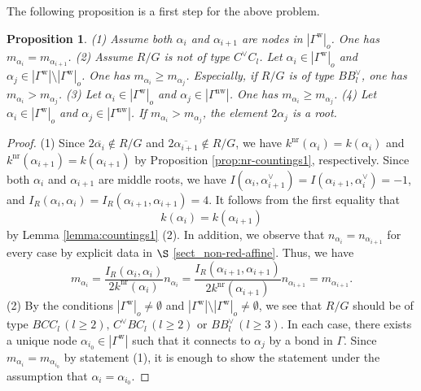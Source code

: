 \documentclass[11pt]{amsart}
\newcommand{\nr}{\mathrm{nr}}
\newcommand{\w}{\mathrm{w}}
\newcommand{\nw}{\mathrm{nw}}
\newtheorem{prop}[thm]{Proposition}%
\begin{document}
{The following proposition is a first step for the above problem.

\begin{prop}\label{prop:shape-diagram1}
{\rm (1)} Assume both $\alpha_i$ and $\alpha_{i+1}$ are nodes in 
$|\Gamma^\w|_o$. One has $m_{\alpha_i}=m_{\alpha_{i+1}}$.
\vskip 1mm
\noindent
{\rm (2)} Assume $R/G$ is not of type $C^\vee C_l$. 
Let $\alpha_i\in |\Gamma^\w|_o$ and 
$\alpha_j\in |\Gamma^\w|\setminus |\Gamma^\w|_o$. 
One has $m_{\alpha_i}\geq m_{\alpha_j}$. Especially, if $R/G$ is of type 
$BB^\vee_l$, one has $m_{\alpha_i}>m_{\alpha_j}$. 
\vskip 1mm
\noindent
{\rm (3)} 
Let $\alpha_i\in |\Gamma^\w|_o$ and 
$\alpha_j\in |\Gamma^\nw|$. 
One has $m_{\alpha_i}\geq m_{\alpha_j}$.
\vskip 1mm
\noindent
{\rm (4)} Let $\alpha_i\in |\Gamma^\w|_o$ and 
$\alpha_j\in |\Gamma^\nw|$. If 
$m_{\alpha_i}> m_{\alpha_j}$, the element $2\alpha_j$ is a root. 
\end{prop}

\begin{proof}
(1) Since $2\overline{\alpha_i}\not\in R/G$ and 
$2\overline{\alpha_{i+1}}\not\in R/G$,
we have $k^\nr(\alpha_i)=k(\alpha_i)$ and $k^\nr(\alpha_{i+1})=k(\alpha_{i+1})$
by Proposition \ref{prop:nr-countings1}, respectively. Since both $\alpha_i$ and
$\alpha_{i+1}$ are middle roots, we have 
$I(\alpha_i,\alpha_{i+1}^\vee)=I(\alpha_{i+1},\alpha_{i}^\vee)=-1$, and
$I_R(\alpha_i,\alpha_{i})=I_R(\alpha_{i+1},\alpha_{i+1})=4$. It follows from the
first equality that 
\begin{equation}
k(\alpha_i)=k(\alpha_{i+1})
\end{equation}
by Lemma \ref{lemma:countings1} (2). 
In addition, we observe that $n_{\alpha_i}=n_{\alpha_{i+1}}$ for every case 
by explicit data in $\S$ \ref{sect_non-red-affine}. Thus, we  have
\[m_{\alpha_i}=\frac{I_R(\alpha_i,\alpha_i)}{2 k^\nr (\alpha_i)}n_{\alpha_i}
=\frac{I_R(\alpha_{i+1},\alpha_{i+1})}{2 k^\nr (\alpha_{i+1})}n_{\alpha_{i+1}}
=m_{\alpha_{i+1}}.\]
\noindent
(2) By the conditions $|\Gamma^\w|_o\ne\emptyset$ and 
$|\Gamma^\w|\setminus |\Gamma^\w|_o\ne \emptyset$, 
we see that $R/G$ should be of type $BCC_l \,(l\geq 2),\,  
C^\vee BC_l\,(l\geq 2)$ or $BB^\vee_l\,(l\geq 3)$. In each case, 
there exists a unique node $\alpha_{i_0}\in |\Gamma^\w|$ such that it connects 
to $\alpha_j$ by a bond in $\Gamma$. Since $m_{\alpha_i}=m_{\alpha_{i_0}}$ by 
statement (1), it is enough to show the statement under the assumption that
$\alpha_i=\alpha_{i_0}$.


\end{proof}}
\end{document}
